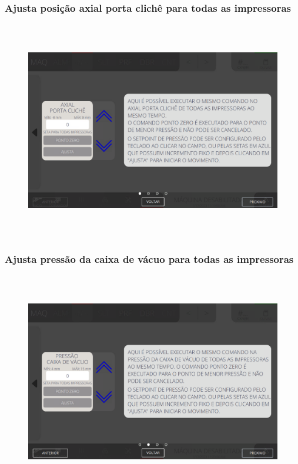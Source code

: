 \subsubsection{\small{Ajusta posição axial porta clichê para todas as impressoras}}\label{telaAjustesImpressorasSegundaTelaDeAjustesImpressorasAjustaPosicaoAxialPortaClicheParaTodasAsImpressoras}
\vspace*{\fill}
\begin{figure}[h]
  \centering
  \includegraphics[width=576px,height=360px]{src/imagesFlexo/04-printter/01-printters/settings/e-9.png}
\end{figure}
\vspace*{\fill}

\newpage
\thispagestyle{fancy}
\vspace*{40 pt}
\subsubsection{\small{Ajusta pressão da caixa de vácuo para todas as impressoras}}\label{telaAjustesImpressorasSegundaTelaDeAjustesImpressorasAjustaPressaoDaCaixaDeVacioParaTodasAsImpressoras}
\vspace*{\fill}
\begin{figure}[h]
  \centering
  \includegraphics[width=576px,height=360px]{src/imagesFlexo/04-printter/01-printters/settings/e-10.png}
\end{figure}
\vspace*{\fill}

